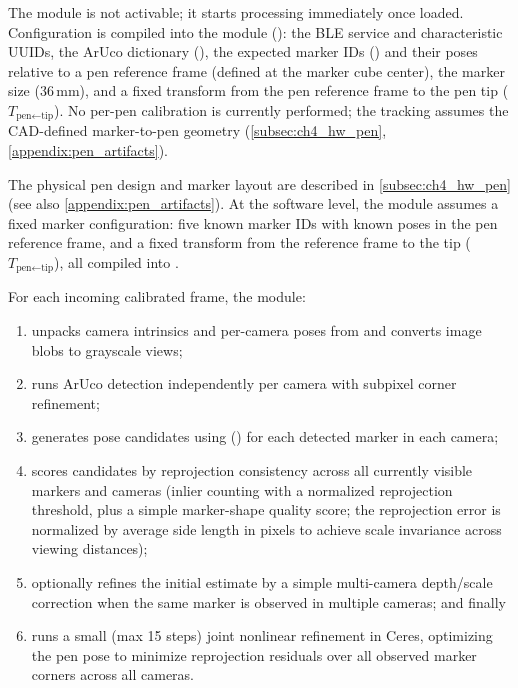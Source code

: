 The module is not activable; it starts processing immediately once loaded.
Configuration is compiled into the module (): the BLE service and characteristic UUIDs, the ArUco dictionary (), the expected marker IDs () and their poses relative to a pen reference frame (defined at the marker cube center), the marker size (36\,mm), and a fixed transform from the pen reference frame to the pen tip
($T_{\text{pen}\leftarrow\text{tip}}$).
No per-pen calibration is currently performed; the tracking assumes the CAD-defined marker-to-pen geometry
(\autoref{subsec:ch4_hw_pen}, \autoref{appendix:pen_artifacts}).

The physical pen design and marker layout are described in \autoref{subsec:ch4_hw_pen} (see also \autoref{appendix:pen_artifacts}).
At the software level, the module assumes a fixed marker configuration: five known marker IDs with known poses in the pen reference frame, and a fixed transform from the reference frame to the tip ($T_{\text{pen}\leftarrow\text{tip}}$), all compiled into .

For each incoming calibrated frame, the module:

\begin{enumerate}[label=(\roman*)]
    \item unpacks camera intrinsics and per-camera poses from  and converts image blobs to grayscale views;
    \item runs ArUco detection independently per camera with subpixel corner refinement;
    \item generates pose candidates using  () for each detected marker in each camera;
    \item scores candidates by reprojection consistency across all currently visible markers and cameras (inlier counting with a normalized reprojection threshold, plus a simple marker-shape quality score; the reprojection error is normalized by average side length in pixels to achieve scale invariance across viewing distances);
    \item optionally refines the initial estimate by a simple multi-camera depth/scale correction when the same marker is observed in multiple cameras; and finally
    \item runs a small (max 15 steps) joint nonlinear refinement in Ceres, optimizing the pen pose to minimize reprojection residuals over all observed marker corners across all cameras.
\end{enumerate}

